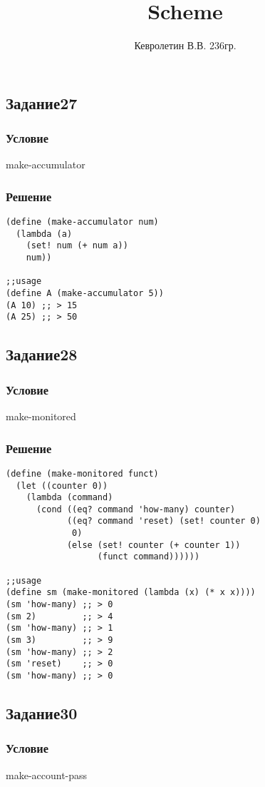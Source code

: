 \documentclass[10pt,a4paper]{article}
\author{Кевролетин В.В. 236гр.}
\title{Scheme}
\begin{document}
\maketitle

\subsection*{Задание27}
\subsubsection*{Условие}
make-accumulator
\subsubsection*{Решение}
\begin{lstlisting}
(define (make-accumulator num)
  (lambda (a)
    (set! num (+ num a))
    num))

;;usage
(define A (make-accumulator 5))
(A 10) ;; > 15
(A 25) ;; > 50
\end{lstlisting}


\subsection*{Задание28}
\subsubsection*{Условие}
make-monitored
\subsubsection*{Решение}
\begin{lstlisting}
(define (make-monitored funct)
  (let ((counter 0))
    (lambda (command)
      (cond ((eq? command 'how-many) counter)
            ((eq? command 'reset) (set! counter 0)
             0)
            (else (set! counter (+ counter 1))
                  (funct command))))))

;;usage
(define sm (make-monitored (lambda (x) (* x x))))
(sm 'how-many) ;; > 0
(sm 2)         ;; > 4
(sm 'how-many) ;; > 1
(sm 3)         ;; > 9
(sm 'how-many) ;; > 2
(sm 'reset)    ;; > 0
(sm 'how-many) ;; > 0
\end{lstlisting}

\subsection*{Задание30}
\subsubsection*{Условие}
make-account-pass
\end{document}

